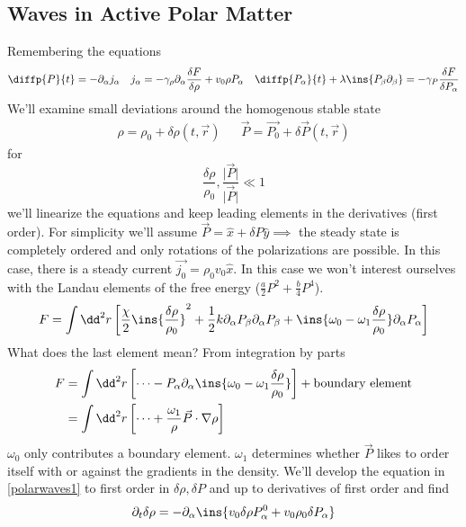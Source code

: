 \subsection{Waves in Active Polar Matter}
Remembering the equations
\begin{align}\label{polarwaves1}
    \diffp{P}{t} = -\partial_\alpha j_\alpha && j_\alpha = -\gamma_\rho\partial_\alpha\frac{\delta F}{\delta\rho}+v_0\rho P_\alpha && \diffp{P_\alpha}{t} + \lambda\ins{P_\beta\partial_\beta} = -\gamma_P \frac{\delta F}{\delta P_\alpha}
\end{align}
We'll examine small deviations around the homogenous stable state
\begin{align}
    \rho = \rho_0 + \delta\rho(t,\vec{r}) && \vec{P} = \vec{P_0} + \delta\vec{P}(t,\vec{r})
\end{align}
for
\begin{equation}
    \frac{\delta \rho}{\rho_0},\frac{\lvert\vec{P}\rvert}{\lvert\vec{P}\rvert} \ll 1
\end{equation}
we'll linearize the equations and keep leading elements in the derivatives (first order). For simplicity we'll assume \(\vec{P} = \hat{x} + \delta P\hat{y}\implies\) the steady state is completely ordered and only rotations of the polarizations are possible. In this case, there is a steady current \(\vec{j_0}=\rho_0v_0\hat{x}\). In this case we won't interest ourselves with the Landau elements of the free energy (\(\frac{a}{2}P^2+\frac{b}{4}P^4\)).
\begin{align}
    F = \int\dd^2 r \left[\frac{\chi}{2}\ins{\frac{\delta\rho}{\rho_0}}^2+\frac{1}{2}k\partial_\alpha P_\beta\partial_\alpha P_\beta + \ins{\omega_0-\omega_1\frac{\delta\rho}{\rho_0}}\partial_\alpha P_\alpha\right]
\end{align}
What does the last element mean? From integration by parts
\begin{align}
    F &= \int\dd^2 r \left[\dots - P_\alpha\partial_\alpha\ins{\omega_0-\omega_1\frac{\delta\rho}{\rho_0}}\right] + \text{boundary element}\\
    &= \int\dd^2 r \left[\dots + \frac{\omega_1}{\rho}\vec{P}\cdot\nabla\rho\right]
\end{align}
\(\omega_0\) only contributes a boundary element. \(\omega_1\) determines whether \(\vec{P}\) likes to order itself with or against the gradients in the density.
We'll develop the equation in \ref{polarwaves1} to first order in \(\delta\rho, \delta P\) and up to derivatives of first order and find
\begin{align}
    \partial_t\delta\rho = -\partial_\alpha\ins{v_0\delta\rho P_\alpha^0 + v_0\rho_0\delta P_\alpha}
\end{align}
